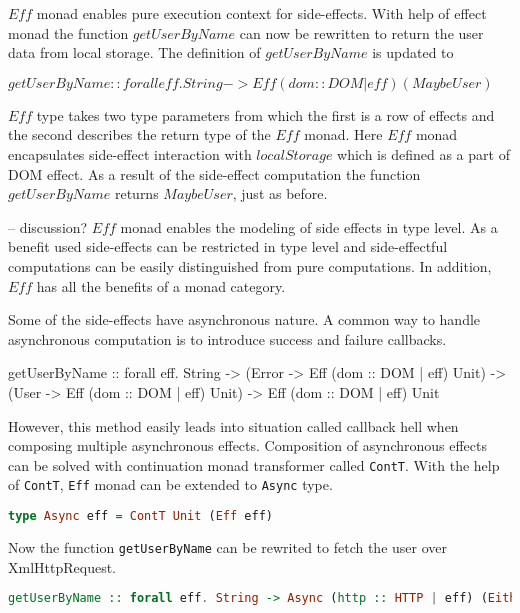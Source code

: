 \documentclass[article]{aaltoseries}
\begin{document}
      $Eff$ monad enables pure execution context for side-effects. With help of effect
      monad the function $getUserByName$ can now be rewritten to return the user data
      from local storage. The definition of $getUserByName$ is updated to

      $getUserByName :: forall eff. String -> Eff (dom :: DOM | eff) (Maybe User)$
 
      $Eff$ type takes two type parameters from which the first is a row of
      effects and the second describes the return type of the $Eff$ monad. Here
      $Eff$ monad encapsulates side-effect interaction with $localStorage$ which is
      defined as a part of DOM effect. As a result of the side-effect
      computation the function $getUserByName$ returns $Maybe User$, just as before.
 
      -- discussion?
      $Eff$ monad enables the modeling of side effects in type level. As a benefit
      used side-effects can be restricted in type level and side-effectful
      computations can be easily distinguished from pure computations. In
      addition, $Eff$ has all the benefits of a monad category.
 
      Some of the side-effects have asynchronous nature. A common way to handle
      asynchronous computation is to introduce success and failure callbacks.
 
      getUserByName :: forall eff. String -> (Error -> Eff (dom :: DOM | eff)
      Unit) -> (User -> Eff (dom :: DOM | eff) Unit) -> Eff (dom :: DOM | eff)
      Unit
 
      However, this method easily leads into situation called callback hell when
      composing multiple asynchronous effects. Composition of asynchronous
      effects can be solved with continuation monad transformer called \lstinline|ContT|.
      With the help of \lstinline|ContT|, \lstinline|Eff| monad can be extended to \lstinline|Async| type.
 
      \begin{lstlisting}[language=Haskell]
        type Async eff = ContT Unit (Eff eff)
      \end{lstlisting}

      Now the function \lstinline|getUserByName| can be rewrited to fetch the user over XmlHttpRequest.

      \begin{lstlisting}[language=Haskell]
      getUserByName :: forall eff. String -> Async (http :: HTTP | eff) (Either Error User)
      \end{lstlisting}
 
\end{document}
